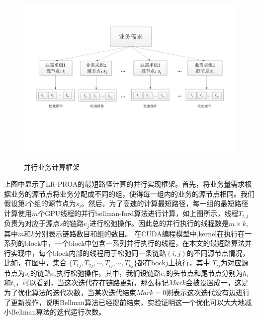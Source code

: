 \begin{figure}
\setlength{\belowcaptionskip}{-0.5cm}
  \begin{center}
    {\includegraphics[width=1 \textwidth]{figures/paframework.pdf}}
    \end{center}
  \caption{{\footnotesize{并行业务计算框架}}}
  \label{ParFramework}
\end{figure}
  上图中显示了LR-PROA的最短路径计算的并行实现框架。首先，将业务量需求根据业务的源节点将业务分配成不同的组，使得每一组内的业务的源节点相同。我们假设第$i$个组的源节点为$s_i$。然后，为了高速的计算最短路径，每一组的最短路径计算使用$m$个GPU线程的并行bellman-ford算法进行计算，如上图所示，线程$T_{i,j}$负责为对应于源点$s$的链路$e_{j}$进行松弛操作。因此总的并行执行的线程数是$m \times k$,其中$m$和$k$分别表示链路数目和组的数目。
  在CUDA编程模型中,kernel在执行在一系列的block中，一个block中包含一系列并行执行的线程，在本文的最短路算法并行实现中，每个block内部的线程用于松弛同一条链路$(i,j)$的不同源节点情况，比如，在图中，集合
$\{T_{1j}, T_{2j}, \cdots, T_{ij}, \cdots, T_{kj}\}$都在bock$j$上执行，其中 $T_{ij}$为对应源节点为$s_i$的链路$e_i$执行松弛操作，其中，我们设链路$e_i$的头节点和尾节点分别为$h_i$和$t_i$，可以看到，当这次迭代存在链路更新，那么标记$Mark$会被设置成一，这是为了优化算法的迭代次数，当某次迭代结束$Mark=0$则表示这次迭代没有边进行了更新操作，说明Bellman算法已经提前结束，实验证明这一个优化可以大大地减小Bellman算法的迭代运行次数。

